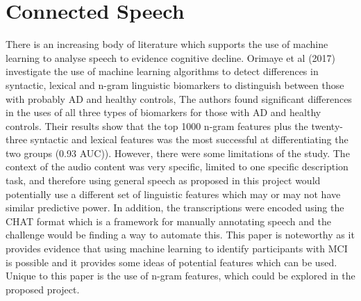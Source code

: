 \documentclass[a4paper]{article}
\begin{document}
\section{Connected Speech}
\par 
There is an increasing body of literature which supports the use of machine learning to analyse speech to evidence cognitive decline. Orimaye et al (2017) investigate the use of machine learning algorithms to detect differences in syntactic, lexical and n-gram linguistic biomarkers to distinguish between those with probably AD and healthy controls, The authors found significant differences in the uses of all three types of biomarkers for those with AD and healthy controls. Their results show that the top 1000 n-gram features plus the twenty-three syntactic and lexical features was the most successful at differentiating the two groups (0.93 AUC)). However, there were some limitations of the study. The context of the audio content was very specific, limited to one specific description task, and therefore using general speech as proposed in this project would potentially use a different set of linguistic features which may or may not have similar predictive power. In addition, the transcriptions were encoded using the CHAT format which is a framework for manually annotating speech and the challenge would be finding a way to automate this. This paper is noteworthy as it provides evidence that using machine learning to identify participants with MCI is possible and it provides some ideas of potential features which can be used. Unique to this paper is the use of n-gram features, which could be explored in the proposed project.\newline
\par
\end{document}
